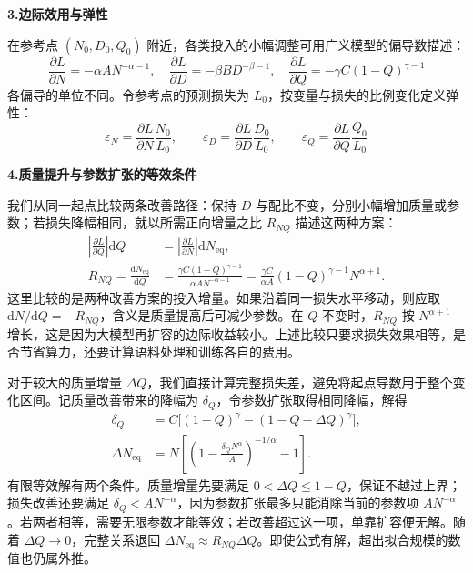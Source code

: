 \textbf{3.边际效用与弹性}\par\nopagebreak[4]
在参考点 $(N_0,D_0,Q_0)$ 附近，各类投入的小幅调整可用广义模型的偏导数描述：
\begin{equation}
    \frac{\partial L}{\partial N} = -\alpha A N^{-\alpha-1},\quad
    \frac{\partial L}{\partial D} = -\beta B D^{-\beta-1},\quad
    \frac{\partial L}{\partial Q} = -\gamma C (1-Q)^{\gamma-1}
\end{equation}
各偏导的单位不同。令参考点的预测损失为 $L_0$，按变量与损失的比例变化定义弹性：
\begin{equation}
    \varepsilon_N = \frac{\partial L}{\partial N}\frac{N_0}{L_0},\qquad
    \varepsilon_D = \frac{\partial L}{\partial D}\frac{D_0}{L_0},\qquad
    \varepsilon_Q = \frac{\partial L}{\partial Q}\frac{Q_0}{L_0}
\end{equation}

\textbf{4.质量提升与参数扩张的等效条件}\par\nopagebreak[4]
我们从同一起点比较两条改善路径：保持 $D$ 与配比不变，分别小幅增加质量或参数；若损失降幅相同，就以所需正向增量之比 $R_{NQ}$ 描述这两种方案：
\begin{equation}
    \begin{aligned}
      \left|\frac{\partial L}{\partial Q}\right|\mathrm dQ
      &=\left|\frac{\partial L}{\partial N}\right|\mathrm dN_{\mathrm{eq}},\\
      R_{NQ}=\frac{\mathrm dN_{\mathrm{eq}}}{\mathrm dQ}
      &=\frac{\gamma C(1-Q)^{\gamma-1}}{\alpha A N^{-\alpha-1}}
       =\frac{\gamma C}{\alpha A}(1-Q)^{\gamma-1}N^{\alpha+1}.
    \end{aligned}
\end{equation}
这里比较的是两种改善方案的投入增量。如果沿着同一损失水平移动，则应取 $\mathrm dN/\mathrm dQ=-R_{NQ}$，含义是质量提高后可减少参数。在 $Q$ 不变时，$R_{NQ}$ 按 $N^{\alpha+1}$ 增长，这是因为大模型再扩容的边际收益较小。上述比较只要求损失效果相等，是否节省算力，还要计算语料处理和训练各自的费用。

对于较大的质量增量 $\Delta Q$，我们直接计算完整损失差，避免将起点导数用于整个变化区间。记质量改善带来的降幅为 $\delta_Q$，令参数扩张取得相同降幅，解得
\begin{equation}
  \begin{aligned}
    \delta_Q &= C\bigl[(1-Q)^\gamma-(1-Q-\Delta Q)^\gamma\bigr],\\
    \Delta N_{\mathrm{eq}}
      &= N\left[\left(1-\frac{\delta_Q N^\alpha}{A}\right)^{-1/\alpha}-1\right].
  \end{aligned}
  \label{eq:p2_finite}
\end{equation}
有限等效解有两个条件。质量增量先要满足 $0<\Delta Q\leq1-Q$，保证不越过上界；损失改善还要满足 $\delta_Q<AN^{-\alpha}$，因为参数扩张最多只能消除当前的参数项 $AN^{-\alpha}$。若两者相等，需要无限参数才能等效；若改善超过这一项，单靠扩容便无解。随着 $\Delta Q\to0$，完整关系退回 $\Delta N_{\mathrm{eq}}\approx R_{NQ}\Delta Q$。即使公式有解，超出拟合规模的数值也仍属外推。

